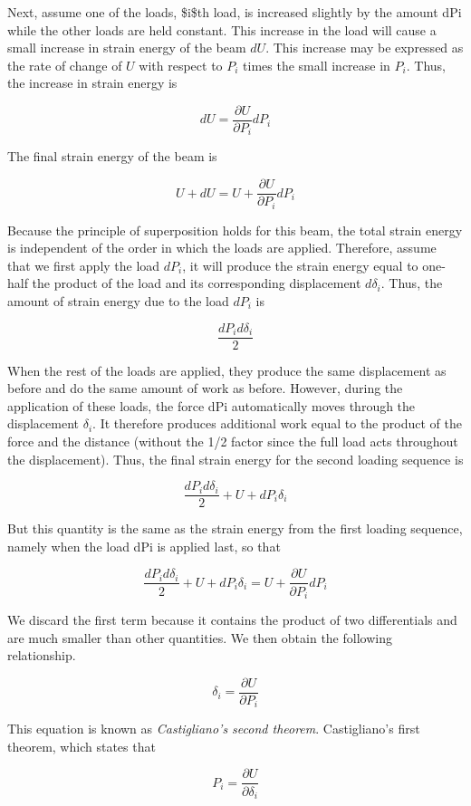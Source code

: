 \documentclass[a4paper,openany,nobib]{tufte-book}
\begin{document}
\begin{enumerate}
Next, assume one of the loads, \$i\$th load, is increased slightly by the
amount dPi while the other loads are held constant. This increase in the
load will cause a small increase in strain energy of the beam \(dU\). This
increase may be expressed as the rate of change of \(U\) with respect to
\(P_i\) times the small increase in \(P_i\). Thus, the increase in strain
energy is

$$dU = \frac{{\partial U}}{{\partial {P_i}}}d{P_i}$$

The final strain energy of the beam is

$$U + dU = U + \frac{{\partial U}}{{\partial {P_i}}}d{P_i}$$

Because the principle of superposition holds for this beam, the total
strain energy is independent of the order in which the loads are
applied. Therefore, assume that we first apply the load \(dP_i\), it will
produce the strain energy equal to one-half the product of the load and
its corresponding displacement \(d\delta_i\). Thus, the amount of strain
energy due to the load \(dP_i\) is

$$\frac{dP_id\delta _i}{2}$$

When the rest of the loads are applied, they produce the same
displacement as before and do the same amount of work as before.
However, during the application of these loads, the force dPi
automatically moves through the displacement \(\delta_i\). It therefore
produces additional work equal to the product of the force and the
distance (without the 1/2 factor since the full load acts throughout the
displacement). Thus, the final strain energy for the second loading
sequence is

$$\frac{dP_id\delta _i}{2} + U + dP_i\delta _i$$

But this quantity is the same as the strain energy from the first
loading sequence, namely when the load dPi is applied last, so that

$$\frac{dP_id\delta _i}{2} + U + dP_i\delta_i = U + \frac{\partial U}{\partial P_i}dP_i$$

We discard the first term because it contains the product of two
differentials and are much smaller than other quantities. We then obtain
the following relationship.

$$\delta_i = \frac{\partial U}{\partial P_i}$$

This equation is known as \emph{Castigliano's second theorem}. Castigliano's
first theorem, which states that

$$P_i = \frac{\partial U}{\partial \delta_i}$$


\end{enumerate}
\end{document}
